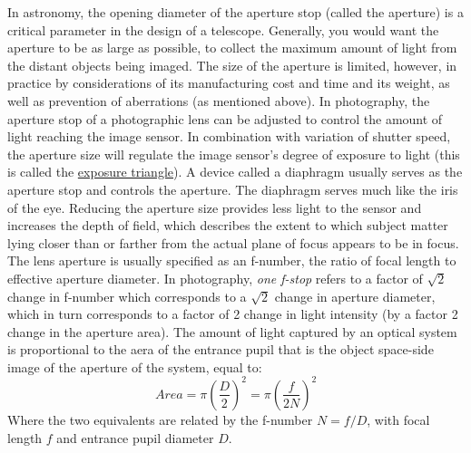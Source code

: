 In astronomy, the opening diameter of the aperture stop (called the aperture) is a critical parameter in the design of a telescope. Generally, you would want the aperture to be as large as possible, to collect the maximum amount of light from the distant objects being imaged. The size of the aperture is limited, however, in practice by considerations of its manufacturing cost and time and its weight, as well as prevention of aberrations (as mentioned above).
\nl
In photography, the aperture stop of a photographic lens can be adjusted to control the amount of light reaching the image sensor. In combination with variation of shutter speed, the aperture size will regulate the image sensor's degree of exposure to light (this is called the \href{https://photographylife.com/what-is-exposure-triangle}{exposure triangle}). A device called a diaphragm usually serves as the aperture stop and controls the aperture. The diaphragm serves much like the iris of the eye. Reducing the aperture size provides less light to the sensor and increases the depth of field, which describes the extent to which subject matter lying closer than or farther from the actual plane of focus appears to be in focus.
The lens aperture is usually specified as an f-number, the ratio of focal length to effective aperture diameter. In photography, \textit{one f-stop} refers to a factor of $\sqrt{2}$ change in f-number which corresponds to a $\sqrt{2}$ change in aperture diameter, which in turn corresponds to a factor of 2 change in light intensity (by a factor 2 change in the aperture area).
The amount of light captured by an optical system is proportional to the aera of the entrance pupil that is the object space-side image of the aperture of the system, equal to:
\[
Area = \pi (\frac{D}{2})^2 = \pi (\frac{f}{2N})^2
\]
Where the two equivalents are related by the f-number $N=f/D$, with focal length $f$ and entrance pupil diameter $D$.

